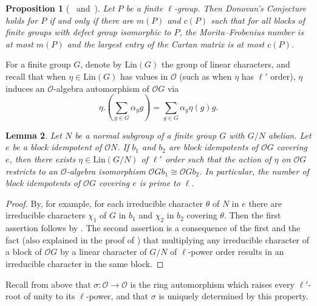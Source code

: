 \documentclass{amsart}
\theoremstyle{plain}\newtheorem{Theorem}{Theorem}[section]
\theoremstyle{plain}\newtheorem{Conjecture}[Theorem]{Conjecture}
\theoremstyle{plain}\newtheorem{Corollary}[Theorem]{Corollary}
\theoremstyle{plain}\newtheorem{Lemma}[Theorem]{Lemma}
\theoremstyle{plain}\newtheorem{Proposition}[Theorem]{Proposition}
\theoremstyle{definition}\newtheorem{Definition}[Theorem]{Definition}
\theoremstyle{definition}\newtheorem{Example}[Theorem]{Example}
\theoremstyle{definition}\newtheorem{Examples}[Theorem]{Examples}
\theoremstyle{definition}\newtheorem{Exercise}[Theorem]{Exercise}
\theoremstyle{definition}\newtheorem{Notation}[Theorem]{Notation}
\theoremstyle{definition}\newtheorem{Remark}[Theorem]{Remark}
\theoremstyle{definition}\newtheorem{Remarks}[Theorem]{Remarks}
\def\CO{{\mathcal{O}}}    \def\OPE{{\mathcal{O}(P\rtimes E)}}
\def\Lin{\mathrm{Lin}}           \def\tenOH{\otimes_{\mathcal{O}H}}
\numberwithin{equation}{section}
\begin{document}
\begin{Proposition}[~\cite{ke04} and~\cite{eel20}]
Let $P$ be a finite $\ell$-group. Then Donovan's Conjecture holds for $P$ if and only if there are $m(P)$ and $c(P)$ such that for all blocks of finite groups with defect group isomorphic to $P$, the Morita--Frobenius number is at most $m(P)$ and the largest entry of the Cartan matrix is at most $c(P)$.     
\end{Proposition}


For a finite group $G$, denote by $\Lin(G)$ the group of linear characters, and recall that when $\eta \in \Lin(G)$ has values in $\CO$ (such as when $\eta$ has $\ell'$ order), $\eta$ induces an $\CO$-algebra automorphism of $\CO G$  via 
$$  \eta. \left(\sum_{g \in G} \alpha_g   g\right)   =    \sum_{g\in G} \alpha_g  \eta(g)  g.$$  


\begin{Lemma} \label{lem:normalabelian}
 Let $N$  be a normal subgroup of a  finite group $G$  with $G/N $ abelian.  Let $e$ be  a block idempotent of  $\CO N$. If $b_1 $ and $b_2$ are block idempotents of $\CO  G$  covering $e$, then  there exists $\eta \in \mathrm{Lin} (G/N)$ of $\ell'$ order such that  the  action  of $\eta $ on $\CO G$   restricts to  an  $\CO$-algebra  isomorphism  $\CO G b_1 \cong   \CO G b_2$. In particular, the number of block idempotents  of $\CO G$  covering $e$ is prime to ${\ell}$. 
\end{Lemma} 




\begin{proof} By, for example, \cite[Thm.~9.4]{N98} for each irreducible character $\theta$ of $N$ in $e$ there are irreducible characters  $\chi_1 $  of $G$ in $b_1 $ and  $\chi_2$ in $b_2 $  covering $\theta$.  Then the first assertion follows by \cite[Lem.~2.9]{FK}. The second assertion is a consequence of the  first and the fact  (also explained in the proof of \cite[Lem.~2.9]{FK}) that multiplying any irreducible character of a block of $\CO G$ by a linear character of $G/N$ of $\ell$-power order results in an irreducible character in the same block.\end{proof}





Recall from above that $\sigma : \CO  \to \CO $ is the ring automorphism  which  raises  every $\ell'$-root  of unity to  its $\ell$-power, and that $\sigma $ is uniquely determined by this property.
\end{document}
